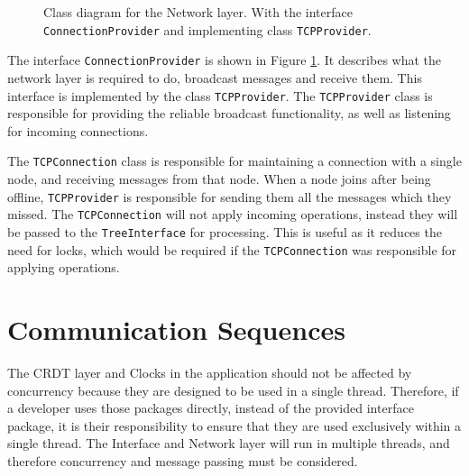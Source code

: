 \documentclass[12pt]{report}
\begin{document}
\begin{figure}[h]
    \centering
    \caption{Class diagram for the Network layer. With the interface \texttt{ConnectionProvider} and implementing class \texttt{TCPProvider}.}
    \label{fig:connection}
\end{figure}

The interface \texttt{ConnectionProvider} is shown in Figure \ref{fig:connection}. It describes what the network layer is required to do, broadcast messages and receive them. This interface is implemented by the class \texttt{TCPProvider}. The \texttt{TCPProvider} class is responsible for providing the reliable broadcast functionality, as well as listening for incoming connections. \par


The \texttt{TCPConnection} class is responsible for maintaining a connection with a single node, and receiving messages from that node. When a node joins after being offline, \texttt{TCPProvider} is responsible for sending them all the messages which they missed. The \texttt{TCPConnection} will not apply incoming operations, instead they will be passed to the \texttt{TreeInterface} for processing. This is useful as it reduces the need for locks, which would be required if the \texttt{TCPConnection} was responsible for applying operations. \par 

\section{Communication Sequences}
The CRDT layer and Clocks in the application should not be affected by concurrency because they are designed to be used in a single thread. Therefore, if a developer uses those packages directly, instead of the provided interface package, it is their responsibility to ensure that they are used exclusively within a single thread. The Interface and Network layer will run in multiple threads, and therefore concurrency and message passing must be considered. \par
\end{document}
